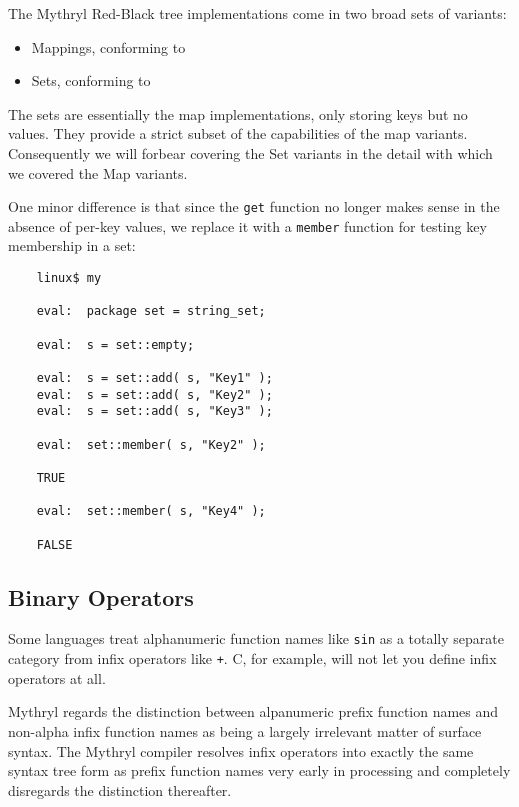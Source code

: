 The Mythryl Red-Black tree implementations come in two broad sets of variants:
\begin{itemize}
\item Mappings, conforming to 
\item Sets, conforming to 
\end{itemize}

The sets are essentially the map implementations, only storing keys but no values. 
They provide a strict subset of the capabilities of the map variants.  Consequently 
we will forbear covering the Set variants in the detail with which we covered the 
Map variants.

One minor difference is that since the {\tt get} function no longer makes sense in 
the absence of per-key values, we replace it with a {\tt member} function for testing 
key membership in a set:

\begin{verbatim}
    linux$ my

    eval:  package set = string_set;

    eval:  s = set::empty;

    eval:  s = set::add( s, "Key1" );
    eval:  s = set::add( s, "Key2" );
    eval:  s = set::add( s, "Key3" );

    eval:  set::member( s, "Key2" );

    TRUE

    eval:  set::member( s, "Key4" );

    FALSE
\end{verbatim}


\cutend*


\cutend*

\subsection{Binary Operators}
\label{section:tut:delving-deeper:binary-operators}

Some languages treat alphanumeric function names like {\tt sin} as a 
totally separate category from infix operators like {\tt +}.  C, 
for example, will not let you define infix operators at all.

Mythryl regards the distinction between alpanumeric prefix function names and non-alpha 
infix function names as being a largely irrelevant matter of surface syntax.  The 
Mythryl compiler resolves infix operators into exactly the same syntax tree form as 
prefix function names very early in processing and completely disregards the distinction 
thereafter.

